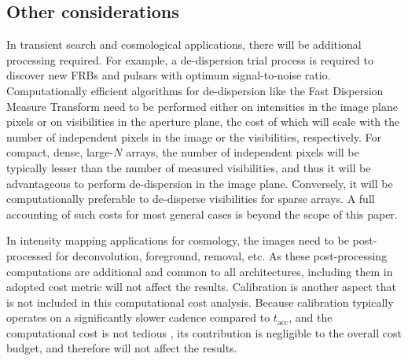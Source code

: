 \documentclass[
  journal=pasa,
  manuscript=article-type,
  year=2020,
  volume=37,
]{cup-journal}
\begin{document}
\subsection{Other considerations}\label{sec:other-metrics}

In transient search and cosmological applications, there will be additional processing required. For example, a de-dispersion trial process is required to discover new FRBs and pulsars with optimum signal-to-noise ratio. Computationally efficient algorithms for de-dispersion like the Fast Dispersion Measure Transform \citep[FDMT;][]{Zackay+2014} need to be performed either on intensities in the image plane pixels or on visibilities in the aperture plane, the cost of which will scale with the number of independent pixels in the image or the visibilities, respectively. For compact, dense, large-$N$ arrays, the number of independent pixels will be typically lesser than the number of measured visibilities, and thus it will be advantageous to perform de-dispersion in the image plane. Conversely, it will be computationally preferable to de-disperse visibilities for sparse arrays. A full accounting of such costs for most general cases is beyond the scope of this paper.

In intensity mapping applications for cosmology, the images need to be post-processed for deconvolution, foreground, removal, etc. As these post-processing computations are additional and common to all architectures, including them in adopted cost metric will not affect the results. Calibration is another aspect that is not included in this computational cost analysis. Because calibration typically operates on a significantly slower cadence compared to $t_\textrm{acc}$, and the computational cost is not tedious \citep{Beardsley+2017,Gorthi+2021}, its contribution is negligible to the overall cost budget, and therefore will not affect the results.
\end{document}
